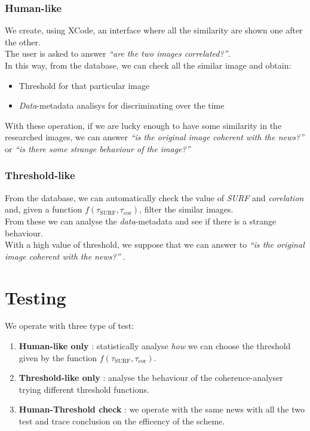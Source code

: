 \documentclass[10pt, journal,twocolumn]{IEEEtran}
\begin{document}
\subsubsection{Human-like}

We create, using XCode, an interface where all the similarity are shown one after the other.\\
The user is asked to answer \emph{``are the two images correlated?''}.\\[0,1cm]
In this way, from the database, we can check all the similar image and obtain:
\begin{itemize}
  \item Threshold for that particular image
  \item \emph{Data}-metadata analisys for discriminating over the time
\end{itemize}

With these operation, if we are lucky enough to have some similarity in the researched images, we can answer \emph{``is the original image coherent with the news?''} or \emph{``is there some strange behaviour of the image?''}

\subsubsection{Threshold-like}

From the database, we can automatically check the value of \emph{SURF} and \emph{corelation} and, given a function $f(\tau_{\text{SURF}} , \tau_{\text{cor}})$, filter the similar images.\\
From these we can analyse the \emph{data}-metadata and see if there is a strange behaviour.\\
With a high value of threshold, we suppose that we can answer to \emph{``is the original image coherent with the news?''} .


\section{Testing}

We operate with three type of test:

\begin{enumerate}
  \item \textbf{Human-like only} : statistically analyse \emph{how} we can choose the threshold given by the function $f(\tau_{\text{SURF}} , \tau_{\text{cor}})$.
  \item \textbf{Threshold-like only} : analyse the behaviour of the coherence-analyser trying different threshold functions.
  \item \textbf{Human-Threshold check} : we operate with the same news with all the two test and trace conclusion on the efficency of the scheme.
\end{enumerate}
\end{document}
